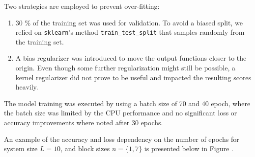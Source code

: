 \documentclass[reprint,amsmath,amssymb,aps,prb]{revtex4-2}
\begin{document}
Two strategies are employed to prevent over-fitting:
\begin{enumerate}
	\item $30$ \% of the training set was used for validation. To avoid a biased split, we relied on \texttt{sklearn}'s method \texttt{train\_test\_split} that samples randomly from the training set.
	\item A bias regularizer was introduced to move the output functions closer to the origin. Even though some further regularization might still be possible, a kernel regularizer did not prove to be useful and impacted the resulting scores heavily.
\end{enumerate}

The model training was executed by using a batch size of 70 and 40 epoch, where the batch size was limited by the CPU performance and no significant loss or accuracy improvements where noted after 30 epochs.

An example of the accuracy and loss dependency on the number of epochs for system size $L=10$, and block sizes $n=\{1, 7\}$ is presented below in Figure \label{fig:val_acc}.%
\end{document}
